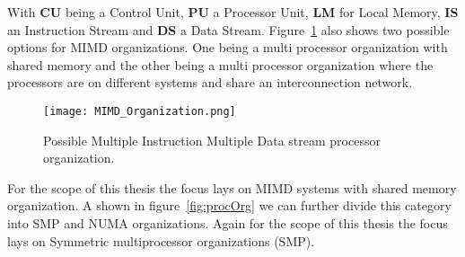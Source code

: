 With \textbf{CU} being a Control Unit, \textbf{PU} a Processor Unit, \textbf{LM} for Local Memory, \textbf{IS} an Instruction Stream and \textbf{DS} a Data Stream.
Figure~\ref{fig:mimdOrg} also shows two possible options for MIMD organizations.
One being a multi processor organization with shared memory and the other being a multi processor organization where the processors are on different systems and share an interconnection network.
\begin{figure}
	\centering
	\texttt{[image: MIMD\_Organization.png]}
	\caption{Possible Multiple Instruction Multiple Data stream processor organization.}
	\label{fig:mimdOrg}
\end{figure}
For the scope of this thesis the focus lays on MIMD systems with shared memory organization.
A shown in figure~\ref{fig:procOrg} we can further divide this category into SMP and NUMA organizations.
Again for the scope of this thesis the focus lays on Symmetric multiprocessor organizations (SMP).

